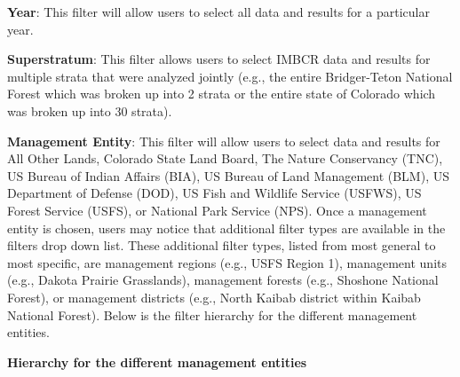 \documentclass[
  letterpaper,
  DIV=11,
  numbers=noendperiod,
  oneside]{scrreprt}
\begin{document}
\textbf{Year}: This filter will allow users to select all data and
results for a particular year.

\textbf{Superstratum}: This filter allows users to select IMBCR data and
results for multiple strata that were analyzed jointly (e.g., the entire
Bridger-Teton National Forest which was broken up into 2 strata or the
entire state of Colorado which was broken up into 30 strata).

\textbf{Management Entity}: This filter will allow users to select data
and results for All Other Lands, Colorado State Land Board, The Nature
Conservancy (TNC), US Bureau of Indian Affairs (BIA), US Bureau of Land
Management (BLM), US Department of Defense (DOD), US Fish and Wildlife
Service (USFWS), US Forest Service (USFS), or National Park Service
(NPS). Once a management entity is chosen, users may notice that
additional filter types are available in the filters drop down list.
These additional filter types, listed from most general to most
specific, are management regions (e.g., USFS Region 1), management units
(e.g., Dakota Prairie Grasslands), management forests (e.g., Shoshone
National Forest), or management districts (e.g., North Kaibab district
within Kaibab National Forest). Below is the filter hierarchy for the
different management entities.

\textbf{Hierarchy for the different management entities}
\end{document}

